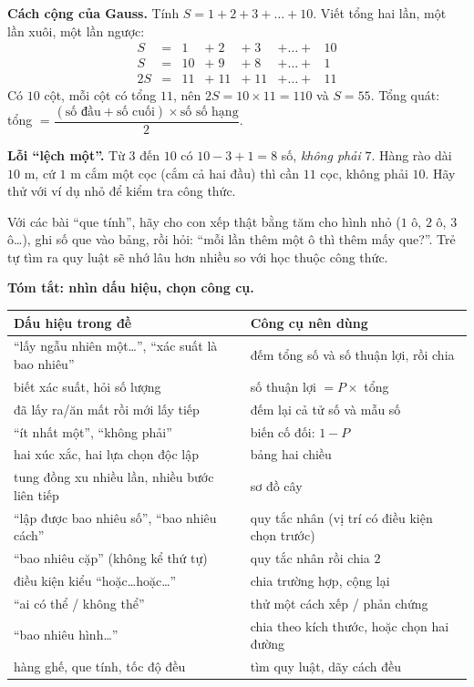\documentclass[11pt]{article}
\begin{document}
\begin{proofbox}
\textbf{Cách cộng của Gauss.} Tính $S=1+2+3+\dots+10$. Viết tổng hai lần, một lần xuôi, một lần ngược:
\[
\begin{array}{rcccccc}
S&=&1&+\;2&+\;3&+\dots+&10\\
S&=&10&+\;9&+\;8&+\dots+&1\\ \hline
2S&=&11&+\;11&+\;11&+\dots+&11
\end{array}
\]
Có $10$ cột, mỗi cột có tổng $11$, nên $2S=10\times11=110$ và $S=55$. Tổng quát: tổng $=\dfrac{(\text{số đầu}+\text{số cuối})\times\text{số số hạng}}{2}$.
\end{proofbox}

\begin{warnbox}
\textbf{Lỗi ``lệch một''.} Từ $3$ đến $10$ có $10-3+1=8$ số, \emph{không phải} $7$. Hàng rào dài $10$ m, cứ $1$ m cắm một cọc (cắm cả hai đầu) thì cần $11$ cọc, không phải $10$. Hãy thử với ví dụ nhỏ để kiểm tra công thức.
\end{warnbox}

\begin{parentbox}
Với các bài ``que tính'', hãy cho con xếp thật bằng tăm cho hình nhỏ ($1$ ô, $2$ ô, $3$ ô\ldots), ghi số que vào bảng, rồi hỏi: ``mỗi lần thêm một ô thì thêm mấy que?''. Trẻ tự tìm ra quy luật sẽ nhớ lâu hơn nhiều so với học thuộc công thức.
\end{parentbox}

\begin{knowbox}
\textbf{Tóm tắt: nhìn dấu hiệu, chọn công cụ.}\par\smallskip
\begin{tabularx}{\linewidth}{@{}>{\raggedright\arraybackslash}X>{\raggedright\arraybackslash}X@{}}
\textbf{Dấu hiệu trong đề} & \textbf{Công cụ nên dùng}\\ \hline
``lấy ngẫu nhiên một\ldots'', ``xác suất là bao nhiêu'' & đếm tổng số và số thuận lợi, rồi chia\\
biết xác suất, hỏi số lượng & số thuận lợi $=P\times$ tổng\\
đã lấy ra/ăn mất rồi mới lấy tiếp & đếm lại cả tử số và mẫu số\\
``ít nhất một'', ``không phải'' & biến cố đối: $1-P$\\
hai xúc xắc, hai lựa chọn độc lập & bảng hai chiều\\
tung đồng xu nhiều lần, nhiều bước liên tiếp & sơ đồ cây\\
``lập được bao nhiêu số'', ``bao nhiêu cách'' & quy tắc nhân (vị trí có điều kiện chọn trước)\\
``bao nhiêu cặp'' (không kể thứ tự) & quy tắc nhân rồi chia $2$\\
điều kiện kiểu ``hoặc\ldots hoặc\ldots'' & chia trường hợp, cộng lại\\
``ai có thể / không thể'' & thử một cách xếp / phản chứng\\
``bao nhiêu hình\ldots'' & chia theo kích thước, hoặc chọn hai đường\\
hàng ghế, que tính, tốc độ đều & tìm quy luật, dãy cách đều\\
\end{tabularx}
\end{knowbox}
\end{document}
